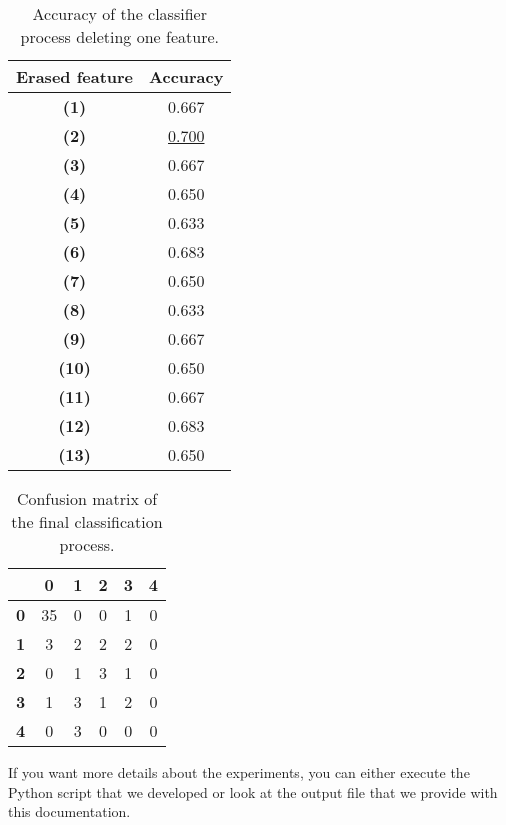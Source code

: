 \begin{table}[hbtp]
    \centering
    \begin{tabular}{c c}
        \toprule
        \textbf{Erased feature} & \textbf{Accuracy} \\ \midrule
        \textbf{(1)} & 0.667 \\
        \textbf{(2)} & \underline{0.700} \\
        \textbf{(3)} & 0.667 \\
        \textbf{(4)} & 0.650 \\
        \textbf{(5)} & 0.633 \\
        \textbf{(6)} & 0.683 \\
        \textbf{(7)} & 0.650 \\
        \textbf{(8)} & 0.633 \\
        \textbf{(9)} & 0.667 \\
        \textbf{(10)} & 0.650 \\
        \textbf{(11)} & 0.667 \\
        \textbf{(12)} & 0.683 \\
        \textbf{(13)} & 0.650 \\
        \bottomrule
    \end{tabular}
    \caption{Accuracy of the classifier process deleting one feature.}
    \label{tab:fourth_exp}
\end{table}


\begin{table}[hbtp]
    \centering
    \begin{tabular}{c c c c c c}
        \toprule
         & \textbf{0} & \textbf{1} & \textbf{2} & \textbf{3} & \textbf{4} \\ \midrule
        \textbf{0} &  35 & 0 & 0 & 1 & 0 \\
        \textbf{1} &  3 & 2 & 2 & 2 & 0 \\
        \textbf{2} &  0 & 1 & 3 & 1 & 0 \\
        \textbf{3} &  1 & 3 & 1 & 2 & 0 \\
        \textbf{4} &  0 & 3 & 0 & 0 & 0 \\
        \bottomrule
    \end{tabular}
    \caption{Confusion matrix of the final classification process.}
    \label{tab:fourth_exp_cm}
\end{table}

If you want more details about the experiments, you can either execute the Python script that we developed or look at the output file that we provide with this documentation.